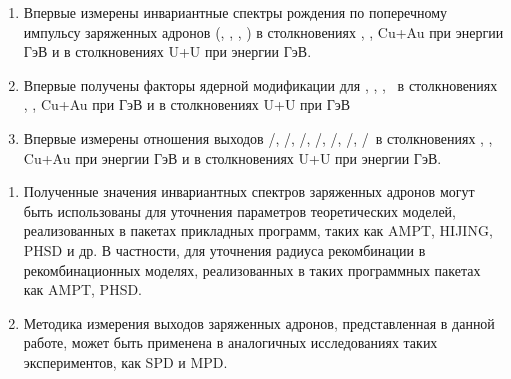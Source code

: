 {\novelty}
\begin{enumerate}[beginpenalty=10000] %
	\item Впервые измерены инвариантные спектры рождения по поперечному импульсу заряженных адронов (\pipm, \Kpm, \prot, \aprot) в столкновениях  \pal, \heau, Cu+Au при энергии  ГэВ и в столкновениях U+U при энергии  ГэВ.
	\item Впервые получены факторы ядерной модификации для \pipm, \Kpm, \prot, \aprot\, в столкновениях  \pal, \heau, Cu+Au при  ГэВ и в столкновениях U+U при  ГэВ
	\item Впервые измерены отношения выходов \pim/\pip, \Km/\Kp, \prot/\aprot, \prot/\pip, \aprot/\pim, \Kp/\pip, \Km/\pim\,  в столкновениях  \pal, \heau, Cu+Au при энергии  ГэВ и в столкновениях U+U при энергии  ГэВ.
\end{enumerate}

{\influence}
\begin{enumerate}[beginpenalty=10000] %
	\item Полученные значения инвариантных спектров заряженных адронов могут быть использованы для уточнения параметров теоретических моделей, реализованных в пакетах прикладных программ, таких как  AMPT, HIJING, PHSD и др. В частности, для уточнения радиуса рекомбинации в рекомбинационных моделях, реализованных в таких программных пакетах как AMPT, PHSD.
	\item Методика измерения выходов заряженных адронов, представленная в данной работе, может быть применена в аналогичных исследованиях таких экспериментов, как SPD и MPD.
	
\end{enumerate}



